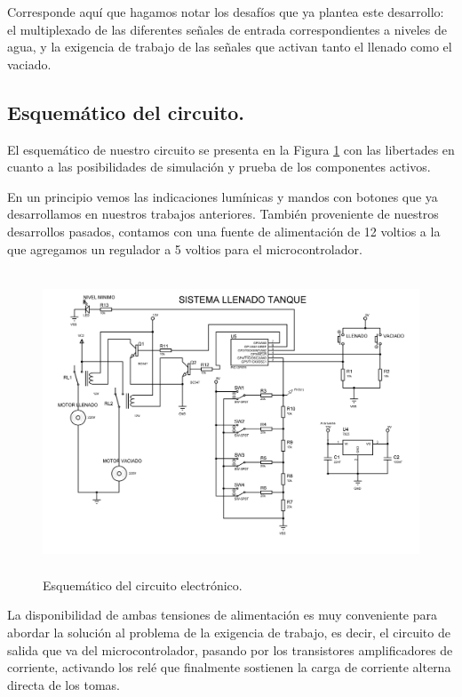 ﻿\documentclass[a4paper]{article}
\begin{document}
Corresponde aquí que hagamos notar los desafíos que ya 
plantea este desarrollo: el multiplexado de las diferentes
señales de entrada correspondientes a niveles de agua, y 
la exigencia de trabajo de las señales que activan tanto el
llenado como el vaciado.

\subsection{Esquemático del circuito.}

El esquemático de nuestro circuito se presenta en la Figura
\ref{fig:esquematico} con las libertades en cuanto a las
posibilidades de simulación y prueba de los componentes 
activos.

En un principio vemos las indicaciones lumínicas y mandos 
con botones que ya desarrollamos en nuestros trabajos 
anteriores. También proveniente de nuestros desarrollos
pasados, contamos con una fuente de alimentación de 12 
voltios a la que agregamos un regulador a 5 voltios para el 
microcontrolador.

\begin{figure}[h]\centering
    \includegraphics[height=9cm]{tp3.jpg}
    \caption{Esquemático del circuito electrónico.}
    \label{fig:esquematico}
\end{figure}

La disponibilidad de ambas tensiones de alimentación es 
muy conveniente para abordar la solución al problema de 
la exigencia de trabajo, es decir, el circuito de salida 
que va del microcontrolador, pasando por los transistores
amplificadores de corriente, activando los relé que
finalmente sostienen la carga de corriente alterna 
directa de los tomas. 
\end{document}
